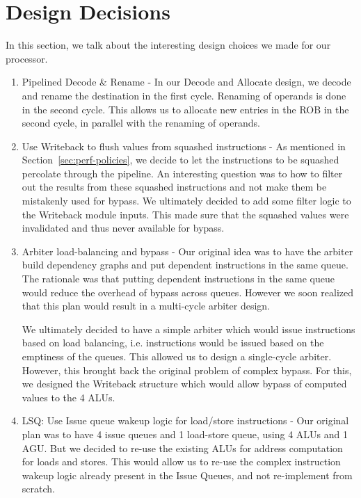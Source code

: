 \documentclass{article}
\begin{document}
\section{Design Decisions}
\label{sec:design-dec}
In this section, we talk about the interesting design choices we made for our
processor.

\begin{enumerate}
	\item Pipelined Decode \& Rename - In our Decode and Allocate design,
	we decode and rename the destination in the first cycle.  Renaming of
	operands is done in the second cycle. This allows us to allocate new
	entries in the ROB in the second cycle, in parallel with the renaming
	of operands.
	
	\item Use Writeback to flush values from squashed instructions - As
	mentioned in Section~\ref{sec:perf-policies}, we decide to let the
	instructions to be squashed percolate through the pipeline.  An
	interesting question was to how to filter out the results from these
	squashed instructions and not make them be mistakenly used for bypass.
	We ultimately decided to add some filter logic to the Writeback module
	inputs. This made sure that the squashed values were invalidated and
	thus never available for bypass.
	
	\item Arbiter load-balancing and bypass - Our original idea was to have
	the arbiter build dependency graphs and put dependent instructions in
	the same queue. The rationale was that putting dependent instructions
	in the same queue would reduce the overhead of bypass across queues.
	However we soon realized that this plan would result in a multi-cycle
	arbiter design.
	
	We ultimately decided to have a simple arbiter which would issue
	instructions based on load balancing, i.e. instructions would be issued
	based on the emptiness of the queues. This allowed us to design a
	single-cycle arbiter. However, this brought back the original problem
	of complex bypass. For this, we designed the Writeback structure which
	would allow bypass of computed values to the 4 ALUs.
	
	\item LSQ: Use Issue queue wakeup logic for load/store instructions -
	Our original plan was to have 4 issue queues and 1 load-store queue,
	using 4 ALUs and 1 AGU. But we decided to re-use the existing ALUs for
	address computation for loads and stores.  This would allow us to
	re-use the complex instruction wakeup logic already present in the
	Issue Queues, and not re-implement from scratch.
	

\end{enumerate}
\end{document}
